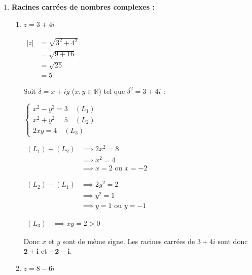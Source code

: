 \documentclass[12pt,a4paper]{article}
\begin{document}
\begin{enumerate}
    \item \textbf{Racines carrées de nombres complexes :}
    
    \begin{enumerate}
        \item $z = 3 + 4i$
        
        $
        \begin{aligned}
            |z| &= \sqrt{3^2 + 4^2}\\
            &= \sqrt{9 + 16}\\
            &= \sqrt{25}\\
            &= 5
        \end{aligned}
        $
        
        Soit $\delta = x + iy$ ($x, y \in \mathbb{R}$) tel que $\delta^2 = 3 + 4i$ :
        
        $
        \begin{cases}
            x^2 - y^2 = 3 \quad (L_1) \\
            x^2 + y^2 = 5 \quad (L_2) \\
            2xy = 4 \quad (L_3)
        \end{cases}
        $
        
        $
        \begin{aligned}
            (L_1) + (L_2) &\implies 2x^2 = 8\\
            &\implies x^2 = 4\\
            &\implies x = 2 \text{ ou } x = -2
        \end{aligned}
        $
        
        $
        \begin{aligned}
            (L_2) - (L_1) &\implies 2y^2 = 2\\
            &\implies y^2 = 1\\
            &\implies y = 1 \text{ ou } y = -1
        \end{aligned}
        $
        
        $
        \begin{aligned}
            (L_3) &\implies xy = 2 > 0
        \end{aligned}
        $
        
        Donc $x$ et $y$ sont de même signe. Les racines carrées de $3 + 4i$ sont donc $\mathbf{2 + i}$ et $\mathbf{-2 - i}$.

        \item $z = 8 - 6i$
        

\end{enumerate}
\end{enumerate}
\end{document}
